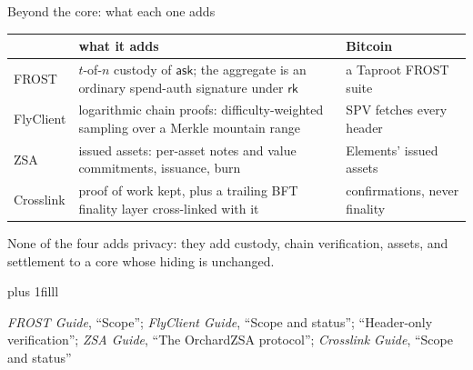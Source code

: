 \documentclass[aspectratio=169,11pt]{beamer}
\newcommand{\rksym}{\ensuremath{\mathsf{rk}}}
\newcommand{\asksym}{\ensuremath{\mathsf{ask}}}
\newcommand{\src}[1]{\par\vskip0pt plus 1filll
  {\fontsize{6}{7.2}\selectfont\color{arbdim}\raggedright #1\par}}
\begin{document}
\begin{frame}{Beyond the core: what each one adds}
\begin{center}\small
\begin{tabular}{@{}p{}p{}p{}@{}}
\toprule
 & what it adds & Bitcoin \\
\midrule
FROST & \raggedright $t$-of-$n$ custody of \asksym; the aggregate is an
  ordinary spend-auth signature under \rksym & a Taproot FROST suite \\
\addlinespace
FlyClient & \raggedright logarithmic chain proofs: difficulty-weighted
  sampling over a Merkle mountain range & SPV fetches every header \\
\addlinespace
ZSA & \raggedright issued assets: per-asset notes and value commitments,
  issuance, burn & Elements' issued assets \\
\addlinespace
Crosslink & \raggedright proof of work kept, plus a trailing BFT finality
  layer cross-linked with it & confirmations, never finality \\
\bottomrule
\end{tabular}
\end{center}
None of the four adds privacy: they add custody, chain verification,
assets, and settlement to a core whose hiding is unchanged.
\src{\emph{FROST Guide}, ``Scope''; \emph{FlyClient Guide}, ``Scope and
status''; ``Header-only verification''; \emph{ZSA Guide}, ``The OrchardZSA
protocol''; \emph{Crosslink Guide}, ``Scope and status''}
\end{frame}
\end{document}
